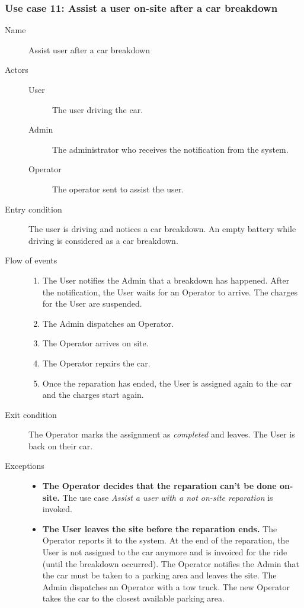	\subsubsection{Use case 11: Assist a user on-site after a car breakdown}
		\begin{description}
			\item[Name] Assist user after a car breakdown
			\item[Actors] \hfill
			\begin{description}
				\item[User] The user driving the car.
				\item[Admin] The administrator who receives the notification from the system.
				\item[Operator] The operator sent to assist the user.
			\end{description}
			\item[Entry condition] The user is driving and notices a car breakdown. An empty battery while driving is considered as a car breakdown.
			\item[Flow of events] \hfill
			\begin{enumerate}
				\item The User notifies the Admin that a breakdown has happened. After the notification, the User waits for an Operator to arrive. The charges for the User are suspended.
				\item The Admin dispatches an Operator.
				\item The Operator arrives on site.
				\item The Operator repairs the car.
				\item Once the reparation has ended, the User is assigned again to the car and the charges start again.
			\end{enumerate}
			\item[Exit condition] The Operator marks the assignment as \textit{completed} and leaves. The User is back on their car.
			\item[Exceptions] \hfill
			\begin{itemize}
				\item \textbf{The Operator decides that the reparation can't be done on-site.} The use case \textit{Assist a user with a not on-site reparation} is invoked.
				\item \textbf{The User leaves the site before the reparation ends.} The Operator reports it to the system. At the end of the reparation, the User is not assigned to the car anymore and is invoiced for the ride (until the breakdown occurred). The Operator notifies the Admin that the car must be taken to a parking area and leaves the site. The Admin dispatches an Operator with a tow truck. The new Operator takes the car to the closest available parking area.

\end{itemize}
\end{description}
